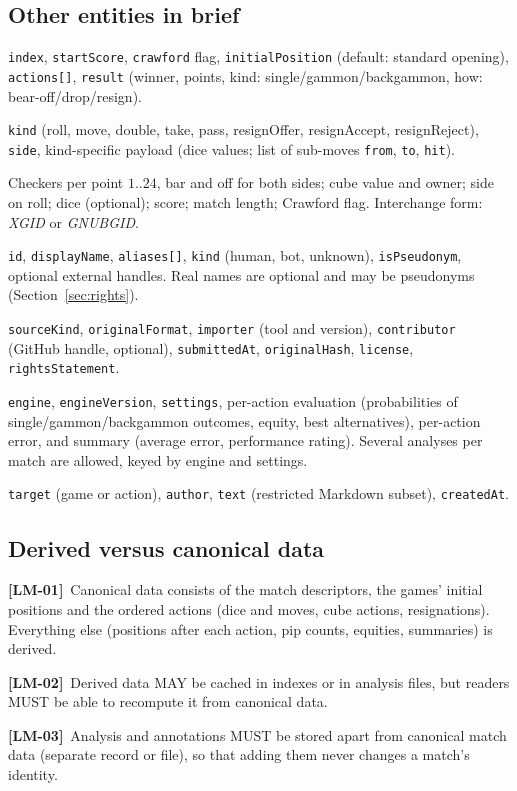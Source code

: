 \documentclass[11pt,a4paper]{article}
\newcommand{\kw}[1]{\textit{#1}\index{#1}}
\newcommand{\req}[2]{\par\smallskip\noindent\hypertarget{#1}{}\textbf{[#1]}\ #2\par}
\begin{document}
\subsection{Other entities in brief}
\begin{description}[leftmargin=0.6cm]
  \item[Game.] \texttt{index}, \texttt{startScore}, \texttt{crawford} flag, \texttt{initialPosition} (default: standard opening), \texttt{actions[]}, \texttt{result} (winner, points, kind: single/gammon/backgammon, how: bear-off/drop/resign).
  \item[Action.] \texttt{kind} (roll, move, double, take, pass, resignOffer, resignAccept, resignReject), \texttt{side}, kind-specific payload (dice values; list of sub-moves \texttt{from}, \texttt{to}, \texttt{hit}).
  \item[Position.] Checkers per point $1..24$, bar and off for both sides; cube value and owner; side on roll; dice (optional); score; match length; Crawford flag. Interchange form: \kw{XGID} or \kw{GNUBGID}.
  \item[Player.] \texttt{id}, \texttt{displayName}, \texttt{aliases[]}, \texttt{kind} (human, bot, unknown), \texttt{isPseudonym}, optional external handles. Real names are optional and may be pseudonyms (Section~\ref{sec:rights}).
  \item[Provenance.] \texttt{sourceKind}, \texttt{originalFormat}, \texttt{importer} (tool and version), \texttt{contributor} (GitHub handle, optional), \texttt{submittedAt}, \texttt{originalHash}, \texttt{license}, \texttt{rightsStatement}.
  \item[Analysis.] \texttt{engine}, \texttt{engineVersion}, \texttt{settings}, per-action evaluation (probabilities of single/gammon/backgammon outcomes, equity, best alternatives), per-action error, and summary (average error, performance rating). Several analyses per match are allowed, keyed by engine and settings.
  \item[Annotation.] \texttt{target} (game or action), \texttt{author}, \texttt{text} (restricted Markdown subset), \texttt{createdAt}.
\end{description}

\subsection{Derived versus canonical data}
\req{LM-01}{Canonical data consists of the match descriptors, the games' initial positions and the ordered actions (dice and moves, cube actions, resignations). Everything else (positions after each action, pip counts, equities, summaries) is derived.}
\req{LM-02}{Derived data MAY be cached in indexes or in analysis files, but readers MUST be able to recompute it from canonical data.}
\req{LM-03}{Analysis and annotations MUST be stored apart from canonical match data (separate record or file), so that adding them never changes a match's identity.}
\end{document}
